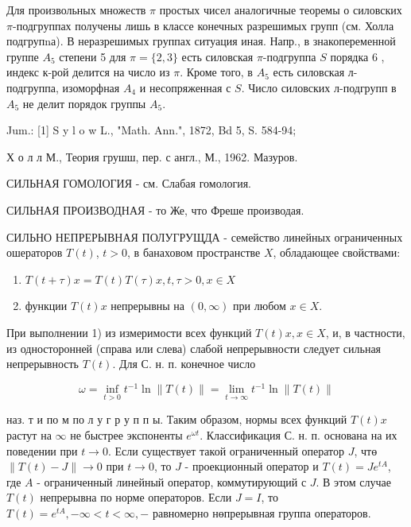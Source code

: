\documentclass[10pt]{article}
\begin{document}
Для произвольных множеств $\pi$ простых чисел аналогичные теоремы о силовских $\pi$-подгруппах получены лишь в классе конечных разрешимых групп (см. Холла подгрупnа). В неразрешимых группах ситуация иная. Напр., в знакопеременной группе $A_{5}$ степени 5 для $\pi=\{2,3\}$ есть силовская $\pi$-подгруппа $S$ порядка 6 , индекс к-рой делится на число из $\pi$. Кроме того, в $A_{5}$ есть силовская л-подгруппа, изоморфная $A_{4}$ и несопряженная с $S$. Число силовских л-подгрупп в $A_{5}$ не делит порядок группы $A_{5}$.



Jum.: [1] S y l o w L., "Math. Ann.", 1872, Bd 5, S. 584-94;



Х о л л М., Теория грушш, пер. с англ., М., 1962. Мазуров.



СИЛЬНАЯ ГОМОЛОГИЯ - см. Слабая гомология.



СИЛЬНАЯ ПРОИЗВОДНАЯ - то Же, что Фреше производая.



СИЛЬНО НЕПРЕРЫВНАЯ ПОЛУГРУЩДА - семейство линейных ограниченных ошераторов $T(t)$, $t>0$, в банаховом пространстве $X$, обладающее свойствами:



\begin{enumerate}

  \item $T(t+\tau) x=T(t) T(\tau) x, t, \tau>0, x \in X$



  \item функции $T(t) x$ непрерывны на $(0, \infty)$ при любом $x \in X$.



\end{enumerate}



При выполнении 1) из измеримости всех функций $T(t) x, x \in X$, и, в частности, из односторонней (справа или слева) слабой непрерывности следует сильная непрерывность $T(t)$. Для С. н. п. конечное число



\[

\omega=\inf _{t>0} t^{-1} \ln \|T(t)\|=\lim _{t \rightarrow \infty} t^{-1} \ln \|T(t)\|

\]



наз. т и по м по л у г р у п п ы. Таким образом, нормы всех функций $T(t) x$ растут на $\infty$ не быстрее экспоненты $e^{\omega t}$. Классификация С. н. п. основана на их поведении при $t \rightarrow 0$. Если существует такой ограниченный оператор $J$, чтө $\|T(t)-J\| \rightarrow 0$ при $t \rightarrow 0$, то $J$ - проекционный оператор и $T(t)=J e^{t A}$, где $A$ - ограниченный линейный оператор, коммутирующий с $J$. В этом случае $T(t)$ непрерывна по норме операторов. Если $J=I$, то $T(t)=e^{t A},-\infty<t<\infty,-$ равномерно нөпрерывная группа операторов.
\end{document}
